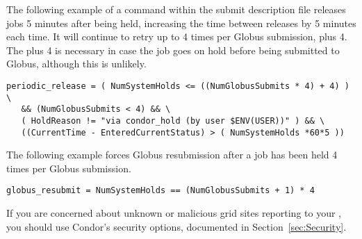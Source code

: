 The following example of a command within the submit description file
releases jobs 5 minutes after being held,
increasing the time between releases by 5 minutes each time.
It will continue to retry up to 4 times per Globus
submission, plus 4.
The plus 4 is necessary in case
the job goes on hold before being submitted to Globus, although
this is unlikely.

\footnotesize
\begin{verbatim}
periodic_release = ( NumSystemHolds <= ((NumGlobusSubmits * 4) + 4) ) \
   && (NumGlobusSubmits < 4) && \
   ( HoldReason != "via condor_hold (by user $ENV(USER))" ) && \
   ((CurrentTime - EnteredCurrentStatus) > ( NumSystemHolds *60*5 ))
\end{verbatim}
\normalsize

The following example forces Globus resubmission after a job has
been held 4 times per Globus submission.

\footnotesize
\begin{verbatim}
globus_resubmit = NumSystemHolds == (NumGlobusSubmits + 1) * 4
\end{verbatim}
\normalsize

If you are concerned about unknown or malicious grid sites reporting
to your , you should use Condor's security options,
documented in Section~\ref{sec:Security}.
